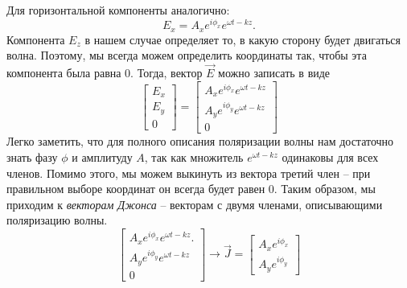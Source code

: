 Для горизонтальной компоненты аналогично:
\[
E_x = A_x e^{i\phi_x}e^{\omega t - kz}.
\]
Компонента $E_z$ в нашем случае определяет то, в какую сторону будет двигаться волна. Поэтому, мы всегда можем определить координаты так, чтобы эта компонента была равна 0. Тогда, вектор $\Vec{E}$ можно записать в виде
\[
\begin{bmatrix} E_x\\ E_y\\ 0 \end{bmatrix} = \begin{bmatrix} A_x e^{i\phi_x}e^{\omega t - kz}\\ A_y e^{i\phi_y}e^{\omega t - kz}\\ 0 \end{bmatrix}
\]
Легко заметить, что для полного описания поляризации волны нам достаточно знать фазу $\phi$ и амплитуду $A$, так как множитель $e^{\omega t - kz}$ одинаковы для всех членов. Помимо этого, мы можем выкинуть из вектора третий член -- при правильном выборе координат он всегда будет равен 0. Таким образом, мы приходим к \textit{векторам Джонса} -- векторам с двумя членами, описывающими поляризацию волны.
\[
\begin{bmatrix} A_x e^{i\phi_x}e^{\omega t - kz}.\\ A_y e^{i\phi_y}e^{\omega t - kz}\\ 0 \end{bmatrix} \rightarrow \Vec{J} = \begin{bmatrix} A_x e^{i\phi_x}\\ A_y e^{i\phi_y}\end{bmatrix}
\]

